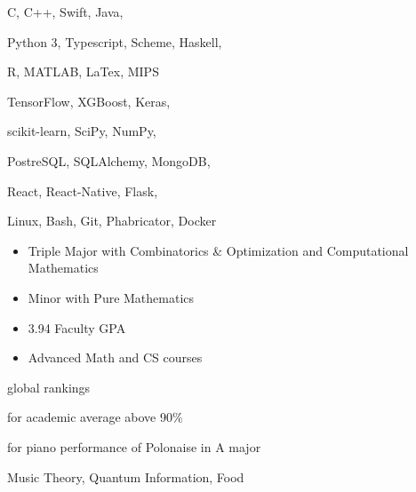C, C++, Swift, Java,
\smallskip

Python 3, Typescript, Scheme, Haskell,
\smallskip

R, MATLAB, LaTex, MIPS

\divider\smallskip

TensorFlow, XGBoost, Keras,
\smallskip

scikit-learn, SciPy, NumPy,
\smallskip

PostreSQL, SQLAlchemy, MongoDB,
\smallskip

React, React-Native, Flask,

\divider\smallskip

Linux, Bash, Git, Phabricator, Docker


\begin{itemize}
    \item Triple Major with Combinatorics \& Optimization and Computational Mathematics
    \item Minor with Pure Mathematics
    \item 3.94 Faculty GPA
    \item Advanced Math and CS courses
\end{itemize}


global rankings

\divider\smallskip

for academic average above 90\%

\divider\smallskip

for piano performance of Polonaise in A major

\divider\smallskip


Music Theory, Quantum Information, Food
